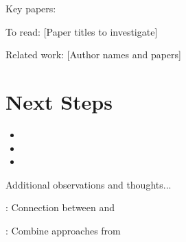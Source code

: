 \documentclass[a4paper,11pt]{article}
\begin{document}
\begin{references}
    \item Key papers: \cite{example2024,author2024,smith2024}
    \item To read: [Paper titles to investigate]
    \item Related work: [Author names and papers]
\end{references}

\section{Next Steps}

\begin{itemize}
    \item {}
    \item {}
    \item {}
\end{itemize}

\begin{notes}
Additional observations and thoughts...

: Connection between \cite{example2024} and \cite{author2024}

: Combine approaches from \cite{example2024,smith2024}

\end{notes}

\newpage
\printbibliography
\end{document}
